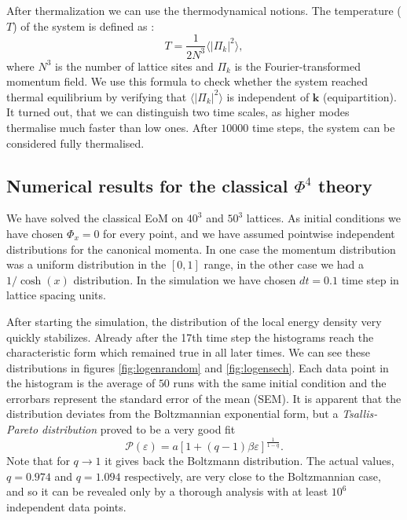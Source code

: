 \documentclass[aps,prd,twocolumn,showpacs,superscriptaddress,groupedaddress]{revtex4}  %
\begin{document}
After thermalization we can use the thermodynamical notions. The
temperature ($T$) of the system is defined as \cite{Homor:2015qza}:
\begin{equation}
T=\frac{1}{2 N^3}\langle\vert\Pi_{k}\vert^2\rangle,
\end{equation}
where $N^3$ is the number of lattice sites and $\Pi_{k}$ is the
Fourier-transformed momentum field. We use this formula to check
whether the system reached thermal equilibrium by verifying that
$\langle\vert\Pi_{k}\vert^2\rangle$ is independent of $\mathbf{k}$
(equipartition). It turned out, that we can distinguish two time
scales, as higher modes thermalise much faster than low ones. After
$10000$ time steps, the system can be considered fully thermalised.

\subsection{Numerical results for the classical $\Phi^4$ theory}




We have solved the classical EoM on $40^3$ and $50^3$ lattices. As
initial conditions we have chosen $\Phi_x=0$ for every point, and we have
assumed pointwise independent distributions for the canonical
momenta. In one case the momentum distribution was a uniform
distribution in the $[0,1]$ range, in the other case we had a
$1/\cosh(x)$ distribution. In the simulation we have chosen $dt=0.1$
time step in lattice spacing units.

After starting the simulation, the distribution of the local energy
density very quickly stabilizes. Already after the 17th time step the
histograms reach the characteristic form which remained true in all
later times. We can see these distributions in figures
\ref{fig:logenrandom} and \ref{fig:logensech}. Each data point in the
histogram is the average of $50$ runs with the same initial condition
and the errorbars represent the standard error of the mean (SEM). It
is apparent that the distribution deviates from the Boltzmannian
exponential form, but a \emph{Tsallis-Pareto distribution} proved to
be a very good fit
\begin{equation}
  \mathcal{P}(\varepsilon)=a \left[ 1+ (q-1)\beta \varepsilon
  \right]^{\frac{1}{1-q}}.
\label{eq:classicTs}
\end{equation}
Note that for $q \rightarrow 1$ it gives back the
Boltzmann distribution. The actual values, $q=0.974$ and $q=1.094$
respectively, are very close to the Boltzmannian case, and so it can
be revealed only by a thorough analysis with at least $10^6$ independent
data points.
\end{document}
